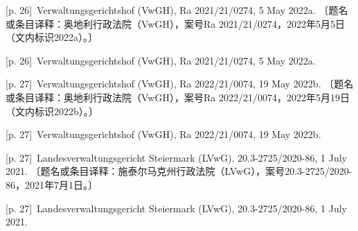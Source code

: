 \documentclass[10pt,a4paper]{article}
\begin{document}
\noindent\begin{minipage}{\textwidth}\begin{minipage}[t]{\dimexpr.5\textwidth-4mm\relax}{\scriptsize\color{gray} [p. 26]}\ Verwaltungsgerichtshof (VwGH), Ra 2021/21/0274, 5 May 2022a. 〔题名或条目译释：奥地利行政法院（VwGH），案号Ra 2021/21/0274，2022年5月5日（文内标识2022a）。〕\par\end{minipage}\hfill\begin{minipage}[t]{\dimexpr.5\textwidth-4mm\relax}{\scriptsize\color{gray} [p. 26]}\ Verwaltungsgerichtshof (VwGH), Ra 2021/21/0274, 5 May 2022a.\par\end{minipage}\end{minipage}\par
\noindent\begin{minipage}{\textwidth}\begin{minipage}[t]{\dimexpr.5\textwidth-4mm\relax}{\scriptsize\color{gray} [p. 27]}\ Verwaltungsgerichtshof (VwGH), Ra 2022/21/0074, 19 May 2022b. 〔题名或条目译释：奥地利行政法院（VwGH），案号Ra 2022/21/0074，2022年5月19日（文内标识2022b）。〕\par\end{minipage}\hfill\begin{minipage}[t]{\dimexpr.5\textwidth-4mm\relax}{\scriptsize\color{gray} [p. 27]}\ Verwaltungsgerichtshof (VwGH), Ra 2022/21/0074, 19 May 2022b.\par\end{minipage}\end{minipage}\par
\noindent\begin{minipage}{\textwidth}\begin{minipage}[t]{\dimexpr.5\textwidth-4mm\relax}{\scriptsize\color{gray} [p. 27]}\ Landesverwaltungsgericht Steiermark (LVwG), 20.3-2725/2020-86, 1 July 2021. 〔题名或条目译释：施泰尔马克州行政法院（LVwG），案号20.3-2725/2020-86，2021年7月1日。〕\par\end{minipage}\hfill\begin{minipage}[t]{\dimexpr.5\textwidth-4mm\relax}{\scriptsize\color{gray} [p. 27]}\ Landesverwaltungsgericht Steiermark (LVwG), 20.3-2725/2020-86, 1 July 2021.\par\end{minipage}\end{minipage}\par
\end{document}
